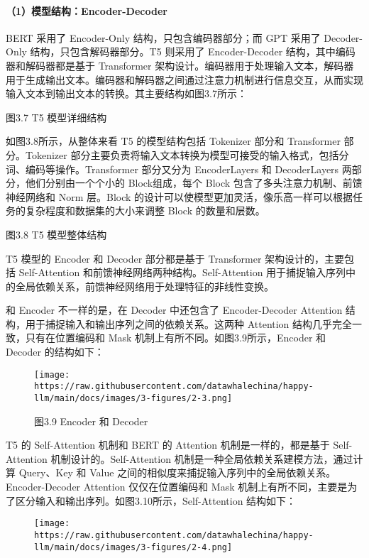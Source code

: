 \documentclass[
]{article}
\begin{document}
\paragraph{（1）模型结构：Encoder-Decoder}\label{ux6a21ux578bux7ed3ux6784encoder-decoder}

BERT 采用了 Encoder-Only 结构，只包含编码器部分；而 GPT 采用了
Decoder-Only 结构，只包含解码器部分。T5 则采用了 Encoder-Decoder
结构，其中编码器和解码器都是基于 Transformer
架构设计。编码器用于处理输入文本，解码器用于生成输出文本。编码器和解码器之间通过注意力机制进行信息交互，从而实现输入文本到输出文本的转换。其主要结构如图3.7所示：

图3.7 T5 模型详细结构

如图3.8所示，从整体来看 T5 的模型结构包括 Tokenizer 部分和 Transformer
部分。Tokenizer
部分主要负责将输入文本转换为模型可接受的输入格式，包括分词、编码等操作。Transformer
部分又分为 EncoderLayers 和 DecoderLayers 两部分，他们分别由一个个小的
Block组成，每个 Block 包含了多头注意力机制、前馈神经网络和 Norm
层。Block
的设计可以使模型更加灵活，像乐高一样可以根据任务的复杂程度和数据集的大小来调整
Block 的数量和层数。

图3.8 T5 模型整体结构

T5 模型的 Encoder 和 Decoder 部分都是基于 Transformer
架构设计的，主要包括 Self-Attention
和前馈神经网络两种结构。Self-Attention
用于捕捉输入序列中的全局依赖关系，前馈神经网络用于处理特征的非线性变换。

和 Encoder 不一样的是，在 Decoder 中还包含了 Encoder-Decoder Attention
结构，用于捕捉输入和输出序列之间的依赖关系。这两种 Attention
结构几乎完全一致，只有在位置编码和 Mask
机制上有所不同。如图3.9所示，Encoder 和 Decoder 的结构如下：

\begin{figure}[htbp]\centering
\texttt{[image: https://raw.githubusercontent.com/datawhalechina/happy-llm/main/docs/images/3-figures/2-3.png]}
\caption{图3.9 Encoder 和 Decoder}
\end{figure}

T5 的 Self-Attention 机制和 BERT 的 Attention 机制是一样的，都是基于
Self-Attention 机制设计的。Self-Attention
机制是一种全局依赖关系建模方法，通过计算 Query、Key 和 Value
之间的相似度来捕捉输入序列中的全局依赖关系。Encoder-Decoder Attention
仅仅在位置编码和 Mask
机制上有所不同，主要是为了区分输入和输出序列。如图3.10所示，Self-Attention
结构如下：

\begin{figure}[htbp]\centering
\texttt{[image: https://raw.githubusercontent.com/datawhalechina/happy-llm/main/docs/images/3-figures/2-4.png]}
\end{figure}
\end{document}
